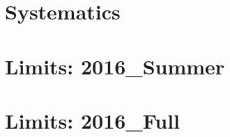 \section{Systematics}
\label{sec:lim-syst}

\section{Limits: 2016\_Summer}
\label{sec:lim-summer}

\section{Limits: 2016\_Full}
\label{sec:lim-full}

